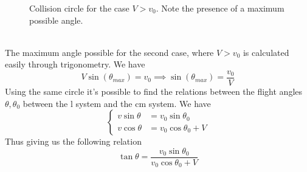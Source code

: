 \documentclass[../admech.tex]{subfiles}
\begin{document}
\begin{minipage}[c]{0.5\textwidth}
	\begin{figure}[H]
		\centering
		\caption{Collision circle for the case $V>v_0$. Note the presence of a maximum possible angle.}
		\label{fig:discirc2}
	\end{figure}
\end{minipage}\\
The maximum angle possible for the second case, where $V>v_0$ is calculated easily through trigonometry. We have
\begin{equation}
	V\sin(\theta_{max})=v_0\implies\sin(\theta_{max})=\frac{v_0}{V}
	\label{eq:maxangledis2p}
\end{equation}
Using the same circle it's possible to find the relations between the flight angles $\theta,\theta_0$ between the l system and the cm system. We have
\begin{equation}
	\left\{ \begin{aligned}
		v\sin\theta&=v_0\sin\theta_0\\
		v\cos\theta&=v_0\cos\theta_0+V
	\end{aligned}\right.
	\label{eq:falcmdiscoord}
\end{equation}
Thus giving us the following relation
\begin{equation}
	\tan\theta=\frac{v_0\sin\theta_0}{v_0\cos\theta_0+V}
	\label{eq:flightangldislcm}
\end{equation}
\end{document}
